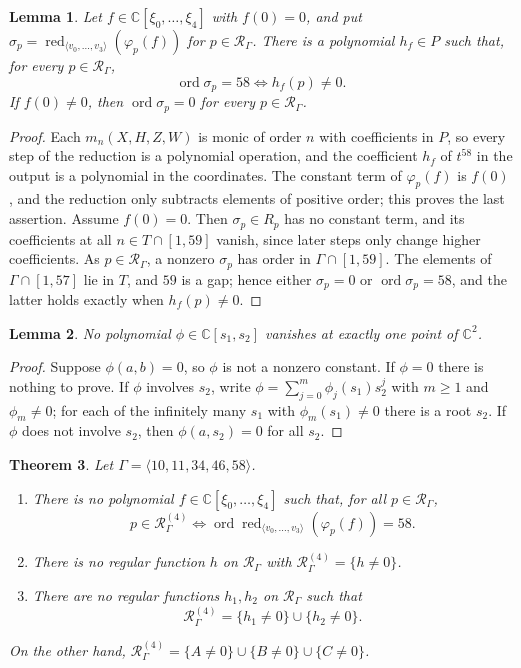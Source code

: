 \documentclass{amsart}
\newtheorem{theorem}{Theorem}[section]
\newtheorem{lemma}[theorem]{Lemma}
\theoremstyle{definition}
\theoremstyle{remark}
\numberwithin{equation}{section}
\newcommand{\CC}{\mathbb{C}}
\newcommand{\Rs}{\mathcal{R}_\Gamma}
\newcommand{\Rd}[1]{\mathcal{R}^{(#1)}_\Gamma}
\DeclareMathOperator{\ord}{ord}
\DeclareMathOperator{\red}{red}
\begin{document}
\begin{lemma}\label{lem:reduction}
Let $f\in\CC[\xi_0,\dots,\xi_4]$ with $f(0)=0$, and put $\sigma_p=\red_{\langle v_0,\dots,v_3\rangle}(\varphi_p(f))$ for $p\in\Rs$. There is a polynomial $h_f\in P$ such that, for every $p\in\Rs$,
\[
\ord\sigma_p=58\iff h_f(p)\ne0 .
\]
If $f(0)\neq0$, then $\ord\sigma_p=0$ for every $p\in\Rs$.
\end{lemma}

\begin{proof}
Each $m_n(X,H,Z,W)$ is monic of order $n$ with coefficients in $P$, so every step of the reduction is a polynomial operation, and the coefficient $h_f$ of $t^{58}$ in the output is a polynomial in the coordinates. The constant term of $\varphi_p(f)$ is $f(0)$, and the reduction only subtracts elements of positive order; this proves the last assertion. Assume $f(0)=0$. Then $\sigma_p\in R_p$ has no constant term, and its coefficients at all $n\in T\cap[1,59]$ vanish, since later steps only change higher coefficients. As $p\in\Rs$, a nonzero $\sigma_p$ has order in $\Gamma\cap[1,59]$. The elements of $\Gamma\cap[1,57]$ lie in $T$, and $59$ is a gap; hence either $\sigma_p=0$ or $\ord\sigma_p=58$, and the latter holds exactly when $h_f(p)\ne0$.
\end{proof}

\begin{lemma}\label{lem:twovar}
No polynomial $\phi\in\CC[s_1,s_2]$ vanishes at exactly one point of $\CC^2$.
\end{lemma}

\begin{proof}
Suppose $\phi(a,b)=0$, so $\phi$ is not a nonzero constant. If $\phi=0$ there is nothing to prove. If $\phi$ involves $s_2$, write $\phi=\sum_{j=0}^m \phi_j(s_1)s_2^j$ with $m\ge1$ and $\phi_m\ne0$; for each of the infinitely many $s_1$ with $\phi_m(s_1)\ne0$ there is a root $s_2$. If $\phi$ does not involve $s_2$, then $\phi(a,s_2)=0$ for all $s_2$.
\end{proof}

\begin{theorem}\label{thm:q47}
Let $\Gamma=\langle 10,11,34,46,58\rangle$.
\begin{enumerate}
\item There is no polynomial $f\in\CC[\xi_0,\dots,\xi_4]$ such that, for all $p\in\Rs$,
\[
p\in\Rd{4}\iff\ord\red_{\langle v_0,\dots,v_3\rangle}(\varphi_p(f))=58 .
\]
\item There is no regular function $h$ on $\Rs$ with $\Rd{4}=\{h\neq0\}$.
\item There are no regular functions $h_1,h_2$ on $\Rs$ such that
\[
\Rd{4}=\{h_1\neq0\}\cup\{h_2\ne0\}.
\]
\end{enumerate}
On the other hand, $\Rd{4}=\{A\ne0\}\cup\{B\ne0\}\cup\{C\ne0\}$.
\end{theorem}
\end{document}
